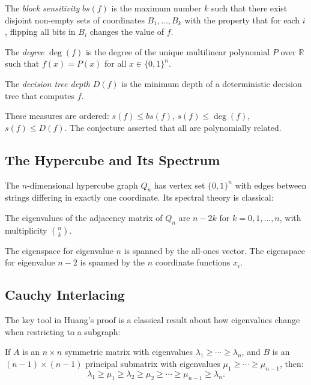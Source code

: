 \begin{definition}
The \emph{block sensitivity} $bs(f)$ is the maximum number $k$ such that there exist disjoint non-empty sets of coordinates $B_1, \ldots, B_k$ with the property that for each $i$, flipping all bits in $B_i$ changes the value of $f$.
\end{definition}

\begin{definition}[Degree]
The \emph{degree} $\deg(f)$ is the degree of the unique multilinear polynomial $P$ over $\mathbb{R}$ such that $f(x) = P(x)$ for all $x \in \{0,1\}^n$.
\end{definition}

\begin{definition}
The \emph{decision tree depth} $D(f)$ is the minimum depth of a deterministic decision tree that computes $f$.
\end{definition}

These measures are ordered: $s(f) \le bs(f)$, $s(f) \le \deg(f)$, $s(f) \le D(f)$. The conjecture asserted that all are polynomially related.

\subsection{The Hypercube and Its Spectrum}

The $n$-dimensional hypercube graph $Q_n$ has vertex set $\{0,1\}^n$ with edges between strings differing in exactly one coordinate. Its spectral theory is classical:

\begin{fact}
The eigenvalues of the adjacency matrix of $Q_n$ are $n - 2k$ for $k = 0, 1, \ldots, n$, with multiplicity $\binom{n}{k}$.
\end{fact}

The eigenspace for eigenvalue $n$ is spanned by the all-ones vector. The eigenspace for eigenvalue $n - 2$ is spanned by the $n$ coordinate functions $x_i$.

\subsection{Cauchy Interlacing}

The key tool in Huang's proof is a classical result about how eigenvalues change when restricting to a subgraph:

\begin{theorem}
If $A$ is an $n \times n$ symmetric matrix with eigenvalues $\lambda_1 \ge \cdots \ge \lambda_n$, and $B$ is an $(n-1) \times (n-1)$ principal submatrix with eigenvalues $\mu_1 \ge \cdots \ge \mu_{n-1}$, then:
\[
\lambda_1 \ge \mu_1 \ge \lambda_2 \ge \mu_2 \ge \cdots \ge \mu_{n-1} \ge \lambda_n.
\]
\end{theorem}

